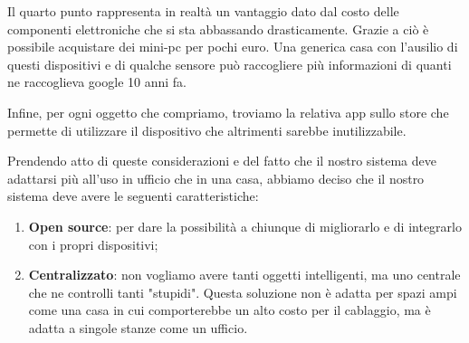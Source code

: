 Il quarto punto rappresenta in realtà un vantaggio dato dal costo delle componenti elettroniche che si sta abbassando drasticamente.
Grazie a ciò è possibile acquistare dei mini-pc per pochi euro. 
Una generica casa con l'ausilio di questi dispositivi e di qualche sensore può raccogliere più informazioni di quanti ne raccoglieva google 10 anni fa.

Infine, per ogni oggetto che compriamo, troviamo la relativa app sullo store che permette di utilizzare il dispositivo che altrimenti sarebbe inutilizzabile.

Prendendo atto di queste considerazioni e del fatto che il nostro sistema deve adattarsi più all'uso in ufficio che in una casa, abbiamo deciso che il nostro sistema deve avere le seguenti caratteristiche:
\begin{enumerate}
\item \textbf{Open source}: per dare la possibilità a chiunque di migliorarlo e di integrarlo con i propri dispositivi;
\item \textbf{Centralizzato}: non vogliamo avere tanti oggetti intelligenti,
ma uno centrale che ne controlli tanti "stupidi". Questa soluzione non è adatta per spazi ampi come una casa in cui comporterebbe un alto costo per il cablaggio, ma è adatta a singole stanze come un ufficio. 
\end{enumerate} 

